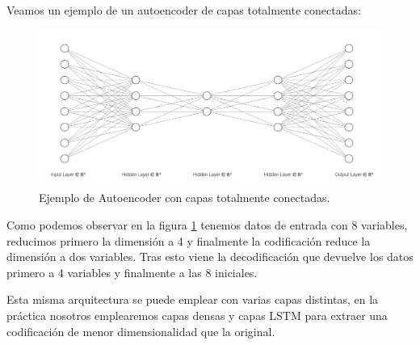 Veamos un ejemplo de un autoencoder de capas totalmente conectadas:

\begin{figure}[H]
	\centering
	\includegraphics[scale=0.35]{imagenes/autoencoder_ejemplo.png}
	\caption{Ejemplo de Autoencoder con capas totalmente conectadas.}
	\label{img:ejemplo-autoencoder}
\end{figure}

Como podemos observar en la figura \ref{img:ejemplo-autoencoder} tenemos datos de entrada con 8 variables, reducimos primero la dimensión a 4 y finalmente la codificación reduce la dimensión a dos variables. Tras esto viene la decodificación que devuelve los datos primero a 4 variables y finalmente a las 8 iniciales.

Esta misma arquitectura se puede emplear con varias capas distintas, en la práctica nosotros emplearemos capas densas y capas LSTM para extraer una codificación de menor dimensionalidad que la original.